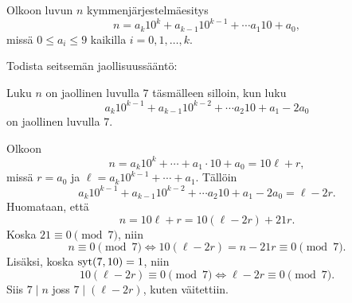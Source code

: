 \documentclass[11pt,a4paper]{amsart}
\begin{document}
\begin{exercise}
  Olkoon luvun \(n\) kymmenjärjestelmäesitys
  \[
    n = a_k 10^k + a_{k-1} 10^{k-1} + \cdots a_1 10 + a_0,
  \]
  missä \(0 \leq a_i \leq 9\) kaikilla \(i = 0, 1, \ldots, k\).

  Todista seitsemän jaollisuussääntö:

  Luku \(n\) on jaollinen luvulla \(7\) täsmälleen silloin, kun luku
  \[
    a_k 10^{k-1} + a_{k-1} 10^{k-2} + \cdots a_2 10 + a_1 - 2a_0
  \]
  on jaollinen luvulla \(7\).
\end{exercise}

\begin{solution}
  Olkoon
  \[
    n = a_k10^k + \cdots + a_1 \cdot 10 + a_0 = 10\ell + r,
  \]
  missä \(r = a_0\) ja \(\ell = a_k10^{k-1} + \cdots + a_1\). Tällöin
  \[
    a_k 10^{k-1} + a_{k-1} 10^{k-2} + \cdots a_2 10 + a_1 - 2a_0 = \ell - 2r.
  \]
  Huomataan, että
  \[
    n = 10\ell + r = 10(\ell - 2r) + 21r.
  \]
  Koska \(21 \equiv 0 \pmod{7}\), niin
  \[
    n \equiv 0 \pmod{7} \iff 10(\ell - 2r) = n - 21r \equiv 0 \pmod{7}.
  \]
  Lisäksi, koska \(\operatorname{syt}(7, 10) = 1\), niin
  \[
    10(\ell - 2r) \equiv 0 \pmod{7} \iff \ell - 2r \equiv 0 \pmod{7}.
  \]
  Siis \(7 \mid n\) joss \(7 \mid (\ell - 2r)\),
  kuten väitettiin.
\end{solution}
\end{document}
